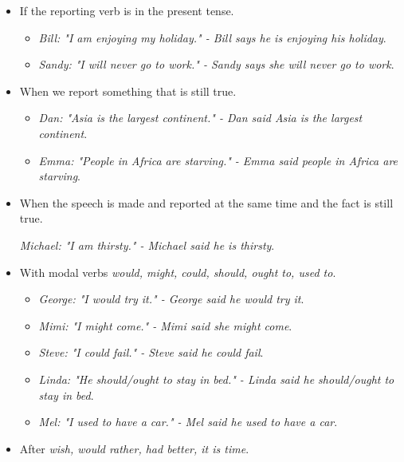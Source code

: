 \begin{itemize}

\item If the reporting verb is in the present tense.

\begin{itemize}
\item \textit{Bill: "I am enjoying my holiday." - Bill says he is enjoying his holiday}.
\item \textit{Sandy: "I will never go to work." - Sandy says she will never go to work}. 
\end{itemize}

\item When we report something that is still true.

\begin{itemize}
\item \textit{Dan: "Asia is the largest continent." - Dan said Asia is the largest continent}.
\item \textit{Emma: "People in Africa are starving." - Emma said people in Africa are starving}.
\end{itemize}

\item When the speech is made and reported at the same time and the fact is still true.

\textit{Michael: "I am thirsty." - Michael said he is thirsty}.

\item With modal verbs \textit{would, might, could, should, ought to, used to}.

\begin{itemize}

\item \textit{George: "I would try it." - George said he would try it}.
\item \textit{Mimi: "I might come." - Mimi said she might come}.
\item \textit{Steve: "I could fail." - Steve said he could fail}.
\item \textit{Linda: "He should/ought to stay in bed." - Linda said he should/ought to stay in bed}.
\item \textit{Mel: "I used to have a car." - Mel said he used to have a car}.

\end{itemize}

\item After \textit{wish, would rather, had better, it is time}.

\begin{itemize}


\end{itemize}
\end{itemize}
